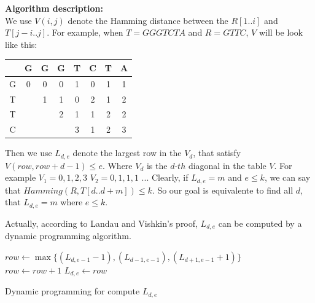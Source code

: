 \documentclass{article}
\begin{document}
\pagebreak

\noindent
\textbf{Algorithm description:} \\

We use $V(i,j)$ denote the Hamming distance between the $R[1..i]$ and $T[j-i..j]$.
For example, when $T=GGGTCTA$ and $R=GTTC$, $V$ will be look like this:

\begin{center}
\begin{tabular}{|c|c|c|c|c|c|c|c|}
    \hline
      & G & G & G & T & C & T & A \\
    \hline
    G & 0 & 0 & 0 & 1 & 0 & 1 & 1 \\
    \hline
    T &   & 1 & 1 & 0 & 2 & 1 & 2 \\
    \hline
    T &   &   & 2 & 1 & 1 & 2 & 2 \\
    \hline
    C &   &   &   & 3 & 1 & 2 & 3 \\
    \hline
\end{tabular}
\end{center}

Then we use $L_{d,e}$ denote the largest row in the $V_{d}$, that satisfy $V(row, row+d-1) \leq e$.
Where $V_{d}$ is the $d$-$th$ diagonal in the table $V$. For example $V_1=0,1,2,3$ $V_2=0,1,1,1$ ...
Clearly, if $L_{d,e} = m$ and $e \leq k$, we can say that $Hamming(R, T[d..d+m]) \leq k$. 
So our goal is equivalente to find all $d$, that $L_{d,e}=m$ where $e \leq k$.

Actually, according to Landau and Vishkin's proof\cite{landau1989fast}, $L_{d,e}$ can be computed by a dynamic programming 
algorithm. 

\begin{algorithm}[H]



     {
         {
            $row \leftarrow \max{\{(L_{d,e-1}-1), (L_{d-1,e-1}), (L_{d+1,e-1}+1)\}}$ \\
             {
                $row \leftarrow row + 1$
            }
            $L_{d,e} \leftarrow row$ \\
             {
            }
        }
    }
    \caption{Dynamic programming for compute $L_{d,e}$}
\end{algorithm}
\end{document}
